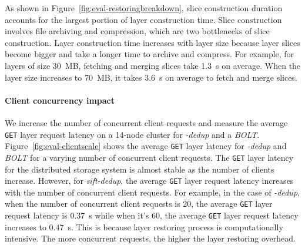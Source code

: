 As shown in Figure~\ref{fig:eval-restoringbreakdown}, slice construction duration accounts for the largest portion of layer construction time.
Slice construction involves file archiving and compression, which are two bottlenecks of slice construction. 
Layer construction time increases with layer size because layer slices become bigger and take a longer time to archive and compress.
For example, for layers of size 30~MB, fetching and merging slices take 1.3~s on average.
When the layer size increases to 70~MB, it takes 3.6~s on average to fetch and merge slices.

\paragraph{Client concurrency impact}
We increase the number of concurrent client requests and measure the average \texttt{GET} layer request latency on a 14-node cluster for \emph{\sysname-dedup} and a \emph{BOLT}.
%
Figure~\ref{fig:eval-clientscale} shows
the average \texttt{GET} layer latency for \emph{\sysname-dedup} and \emph{BOLT} for a varying number of concurrent client requests.
The \texttt{GET} layer latency for the distributed storage system is almost stable as the number of clients increase.
However, for \emph{sift-dedup}, the average \texttt{GET} layer request latency increases with the number of concurrent client requests.
For example, in the case of \emph{\sysname-dedup}, when the number of concurrent client requests is 20, the average \texttt{GET} layer request latency is 0.37~s while when it's 60, the average \texttt{GET} layer request latency  increases to 0.47~s.
This is because layer restoring process is computationally intensive.
The more concurrent requests, the higher the layer restoring overhead.

